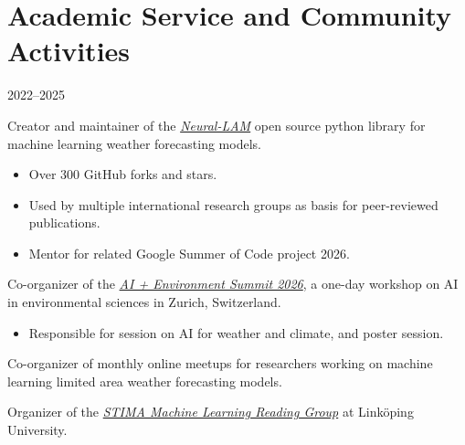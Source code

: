 \section*{Academic Service and Community Activities}
\begin{labeling}{2022--2025}
    \item [2023--] Creator and maintainer of the \href{https://github.com/mllam/neural-lam}{\textit{Neural-LAM}} open source python library for machine learning weather forecasting models.
        \begin{itemize}
            \item Over 300 GitHub forks and stars.
            \item Used by multiple international research groups as basis for peer-reviewed publications.
            \item Mentor for related Google Summer of Code project 2026.
        \end{itemize}
    \item [2026] Co-organizer of the \href{https://ai-environment-summit.com/}{\textit{AI + Environment Summit 2026}}, a one-day workshop on AI in environmental sciences in Zurich, Switzerland.
        \begin{itemize}
            \item Responsible for session on AI for weather and climate, and poster session.
        \end{itemize}

    \item [2023--2025] Co-organizer of monthly online meetups for researchers working on machine learning limited area weather forecasting models. %
    \item [2022--2025] Organizer of the \href{https://github.com/STIMALiU/ml-reading-group}{\textit{STIMA Machine Learning Reading Group}} at Linköping University.
\end{labeling}
